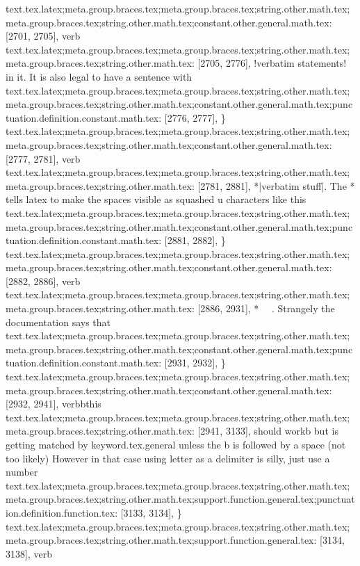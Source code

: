 {{{{{{{{{{{{{{{{{{{{{{{{{{{{{{{{{{{{{{{{{{{{{{{{{{{{{{{{{{{{{{{{{{{{{{{{{{{{{{{{{{{{{{{{{{{text.tex.latex;meta.group.braces.tex;meta.group.braces.tex;string.other.math.tex;meta.group.braces.tex;string.other.math.tex;constant.other.general.math.tex: [2701, 2705], {verb}
text.tex.latex;meta.group.braces.tex;meta.group.braces.tex;string.other.math.tex;meta.group.braces.tex;string.other.math.tex: [2705, 2776], {!verbatim statements! in it.  It is also legal to have a sentence with }
text.tex.latex;meta.group.braces.tex;meta.group.braces.tex;string.other.math.tex;meta.group.braces.tex;string.other.math.tex;constant.other.general.math.tex;punctuation.definition.constant.math.tex: [2776, 2777], {\}
text.tex.latex;meta.group.braces.tex;meta.group.braces.tex;string.other.math.tex;meta.group.braces.tex;string.other.math.tex;constant.other.general.math.tex: [2777, 2781], {verb}
text.tex.latex;meta.group.braces.tex;meta.group.braces.tex;string.other.math.tex;meta.group.braces.tex;string.other.math.tex: [2781, 2881], {*|verbatim stuff|.  The * tells latex to make the spaces visible as squashed u characters like this }
text.tex.latex;meta.group.braces.tex;meta.group.braces.tex;string.other.math.tex;meta.group.braces.tex;string.other.math.tex;constant.other.general.math.tex;punctuation.definition.constant.math.tex: [2881, 2882], {\}
text.tex.latex;meta.group.braces.tex;meta.group.braces.tex;string.other.math.tex;meta.group.braces.tex;string.other.math.tex;constant.other.general.math.tex: [2882, 2886], {verb}
text.tex.latex;meta.group.braces.tex;meta.group.braces.tex;string.other.math.tex;meta.group.braces.tex;string.other.math.tex: [2886, 2931], {*~ ~.  Strangely the documentation says that }
text.tex.latex;meta.group.braces.tex;meta.group.braces.tex;string.other.math.tex;meta.group.braces.tex;string.other.math.tex;constant.other.general.math.tex;punctuation.definition.constant.math.tex: [2931, 2932], {\}
text.tex.latex;meta.group.braces.tex;meta.group.braces.tex;string.other.math.tex;meta.group.braces.tex;string.other.math.tex;constant.other.general.math.tex: [2932, 2941], {verbbthis}
text.tex.latex;meta.group.braces.tex;meta.group.braces.tex;string.other.math.tex;meta.group.braces.tex;string.other.math.tex: [2941, 3133], { should workb but  is getting matched by keyword.tex.general unless the b is followed by  a space (not too likely) However in that case using letter as a delimiter is silly, just use a number }
text.tex.latex;meta.group.braces.tex;meta.group.braces.tex;string.other.math.tex;meta.group.braces.tex;string.other.math.tex;support.function.general.tex;punctuation.definition.function.tex: [3133, 3134], {\}
text.tex.latex;meta.group.braces.tex;meta.group.braces.tex;string.other.math.tex;meta.group.braces.tex;string.other.math.tex;support.function.general.tex: [3134, 3138], {verb}
}}}}}}}}}}}}}}}}}}}}}}}}}}}}}}}}}}}}}}}}}}}}}}}}}}}}}}}}}}}}}}}}}}}}}}}}}}}}}}}}}}}}}}}}}}}}}}}
